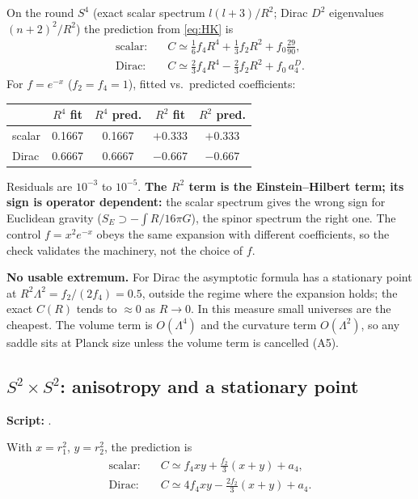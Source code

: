 \documentclass[11pt]{article}
\newcommand{\repo}{https://github.com/juhameskanen/abstract/blob/main/tests}
\newcommand{\testfile}[1]{\href{\repo/#1}{\texttt{\detokenize{#1}}}}
\begin{document}
On the round $S^4$ (exact scalar spectrum $l(l+3)/R^2$; Dirac $D^2$ eigenvalues $(n+2)^2/R^2$) the prediction from \eqref{eq:HK} is
\begin{align}
\text{scalar:}&\quad C\simeq\tfrac16 f_4R^4+\tfrac13 f_2R^2+f_0\tfrac{29}{90},\\
\text{Dirac:}&\quad C\simeq\tfrac23 f_4R^4-\tfrac23 f_2R^2+f_0\,a_4^{D}.
\end{align}
For $f=e^{-x}$ ($f_2=f_4=1$), fitted vs.\ predicted coefficients:
\begin{center}
\small
\begin{tabular}{@{}lcccc@{}}
\toprule
 & $R^4$ fit & $R^4$ pred. & $R^2$ fit & $R^2$ pred.\\
\midrule
scalar & 0.1667 & 0.1667 & $+0.333$ & $+0.333$\\
Dirac & 0.6667 & 0.6667 & $-0.667$ & $-0.667$\\
\bottomrule
\end{tabular}
\end{center}
Residuals are $10^{-3}$ to $10^{-5}$. \textbf{The $R^2$ term is the Einstein--Hilbert term; its sign is operator dependent:} the scalar spectrum gives the wrong
sign for Euclidean gravity ($S_E\supset-\int R/16\pi G$), the spinor spectrum the right one.
The control $f=x^2e^{-x}$ obeys the same expansion with different coefficients, so the check
validates the machinery, not the choice of $f$.

\textbf{No usable extremum.} For Dirac the asymptotic formula has a stationary point at
$R^2\Lambda^2=f_2/(2f_4)=0.5$, outside the regime where the expansion holds; the exact $C(R)$ tends to $\approx0$ as
$R\to0$. In this measure small universes are the cheapest. The volume term is $O(\Lambda^4)$ and the
curvature term $O(\Lambda^2)$, so any saddle sits at Planck size unless the volume term is cancelled (A5).


\subsection{\texorpdfstring{$S^2\times S^2$}{S2xS2}: anisotropy and a stationary point}
\label{sec:s2s2}
\textbf{Script:} \testfile{s2xs2_cost_scan.py}.

With $x=r_1^2$, $y=r_2^2$, the prediction is
\begin{align}
\text{scalar:}&\quad C\simeq f_4xy+\tfrac{f_2}{3}(x+y)+a_4,\\
\text{Dirac:}&\quad C\simeq 4f_4xy-\tfrac{2f_2}{3}(x+y)+a_4.
\end{align}
\end{document}
